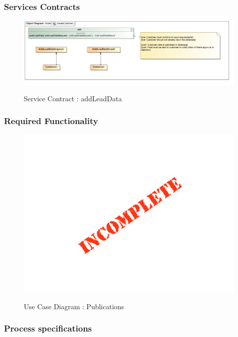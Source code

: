 \documentclass{article}
\begin{document}
		\subsubsection{Services Contracts}

		\begin{figure}[H]
		\includegraphics[width=\textwidth]{images/obj__createCustomer.jpg}  \\
		\caption{Service Contract : addLeadData}
		\end{figure}

		\subsubsection{Required Functionality}

		\begin{figure}[H]
		\includegraphics[width=\textwidth]{images/Incomplete.png}  \\
		\caption{Use Case Diagram : Publications}
		\end{figure}

		\subsubsection{Process specifications}
\end{document}
